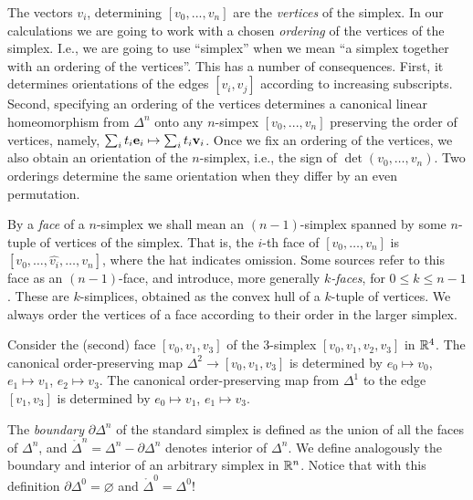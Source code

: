 \documentclass[11pt,a4paper]{report}
\begin{document}
		      
		      
		      The vectors $v_i$, determining  $ [v_0,... , v_n] $
		      are the \emph{vertices} of the simplex.
		      In our calculations we are going to work with a chosen \emph{ordering} of the vertices of the simplex. I.e., 
		      we are going to use  ``simplex'' when we  mean ``a simplex together with an ordering of the vertices''.
		      This has a number of consequences. First, it
              determines orientations of the edges $[v_i, v_j]$ according to increasing subscripts.
              Second, specifying an ordering of the vertices  determines
              a canonical linear homeomorphism from   
              $\Delta^n$ onto any $n$-simpex $ [v_0,... , v_n] $ preserving 
              the order of vertices, namely,
              $\sum_i t_i{\bf e}_i\mapsto \sum_i t_i {\bf v}_i$.
	      Once we fix an ordering of the vertices, we also obtain  an orientation of the $n$-simplex, i.e., the sign of
	      $\det(v_0,\ldots,v_n)$. Two orderings determine the same orientation when they differ by an even permutation.
	      
	      By a \emph{face} of a $n$-simplex we shall mean an $(n-1)$-simplex spanned by some $n$-tuple of vertices of the simplex. That is,
	      the $i$-th face of $[v_0,\ldots,v_n]$ is
	       $[v_0,\ldots,\widehat{v_i},\ldots,v_n]$, where the hat indicates omission. Some sources refer to this face as an
	       $(n-1)$-face, and introduce, more generally  \emph{$k$-faces}, for $0\leq k\leq n-1$. These are $k$-simplices, obtained as
	       the convex hull of  a $k$-tuple of vertices. We always order the vertices of a face according to their order
	       in the larger simplex.
	       
	       \begin{Ex}
	       	Consider the (second) face $[v_0,v_1,v_3]$ of the $3$-simplex $[v_0,v_1,v_2,v_3]$ in $\mathbb{R}^4$. The canonical order-preserving map
	       	$\Delta^2\to [v_0,v_1,v_3]$ is determined by $e_0\mapsto v_0$, $e_1\mapsto v_1$, $e_2\mapsto v_3$. The canonical order-preserving
	       	map from $\Delta^1$ to the edge $[v_1,v_3]$ is determined by $e_0\mapsto v_1$, $e_1\mapsto v_3$.
	       \end{Ex}

	      
		      
		     
                    
             The \emph{boundary} $\partial\Delta^n$ of the standard simplex is defined as the union of all the faces of $\Delta^n$, and
             $\mathring{\Delta}^n = \Delta^n - \partial\Delta^n $ denotes interior of $\Delta^n$. We define analogously the boundary and
             interior of an arbitrary simplex in $\mathbb{R}^n$.
             Notice that with this definition  $\partial \Delta^0=\varnothing$ and $\mathring{\Delta}^0= \Delta^0$!
             
\end{document}
